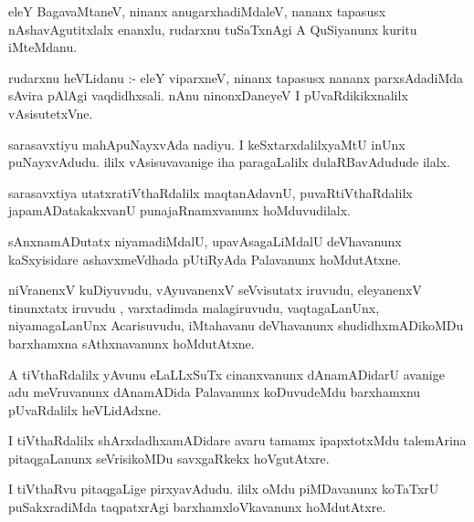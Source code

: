 \documentclass{article}
\begin{document}
\begin{mn}
eleY  BagavaMtaneV,  ninanx  anugarxhadiMdaleV,  nananx  tapasusx  nAshavAgutitxlalx  
enanxlu,  rudarxnu  tuSaTxnAgi A  QuSiyanunx  kuritu  iMteMdanu.
\end{mn}

\begin{mn}
rudarxnu  heVLidanu :- eleY  viparxneV,  ninanx  tapasusx  nananx  parxsAdadiMda  sAvira  
pAlAgi  vaqdidhxsali.  nAnu  ninonxDaneyeV  I  pUvaRdikikxnalilx  vAsisutetxVne.
\end{mn}

\begin{mn}
sarasavxtiyu  mahApuNayxvAda  nadiyu.  I  keSxtarxdalilxyaMtU  inUnx  puNayxvAdudu.  
ililx  vAsisuvavanige  iha  paragaLalilx  dulaRBavAdudude  ilalx.
\end{mn}

\begin{mn}
sarasavxtiya  utatxratiVthaRdalilx  maqtanAdavnU,  puvaRtiVthaRdalilx  
japamADatakakxvanU  punajaRnamxvanunx  hoMduvudilalx.   
\end{mn}

\begin{mn}
sAnxnamADutatx  niyamadiMdalU,  upavAsagaLiMdalU  deVhavanunx  kaSxyisidare  
ashavxmeVdhada  pUtiRyAda  Palavanunx  hoMdutAtxne.
\end{mn}

\begin{mn}
niVranenxV  kuDiyuvudu,  vAyuvanenxV  seVvisutatx  iruvudu,  eleyanenxV  tinunxtatx  
iruvudu ,  varxtadimda  malagiruvudu,  vaqtagaLanUnx,  niyamagaLanUnx  Acarisuvudu,  
iMtahavanu  deVhavanunx  shudidhxmADikoMDu  barxhamxna  sAthxnavanunx  hoMdutAtxne.
\end{mn}

\begin{mn}
A  tiVthaRdalilx  yAvunu  eLaLLxSuTx  cinanxvanunx  dAnamADidarU  avanige  adu  
meVruvanunx  dAnamADida  Palavanunx  koDuvudeMdu  barxhamxnu  pUvaRdalilx  heVLidAdxne.  
\end{mn}

\begin{mn}
I tiVthaRdalilx  shArxdadhxamADidare  avaru  tamamx  ipapxtotxMdu talemArina  
pitaqgaLanunx  seVrisikoMDu  savxgaRkekx  hoVgutAtxre.
\end{mn}

\begin{mn}
I tiVthaRvu  pitaqgaLige  pirxyavAdudu.  ililx  oMdu  piMDavanunx  koTaTxrU  
puSakxradiMda  taqpatxrAgi  barxhamxloVkavanunx  hoMdutAtxre.
\end{mn}
\end{document}

